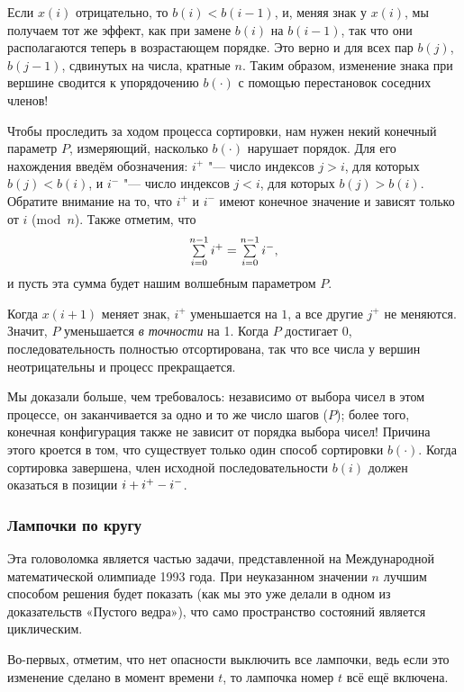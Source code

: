 \documentclass[twoside]{book}
\begin{document}
Если $x(i)$ отрицательно, то $b(i) < b(i-1)$, и, меняя знак у $x(i)$, мы получаем тот же эффект, как при замене $b(i)$ на $b(i - 1)$, так что они располагаются теперь в возрастающем порядке.
Это верно и для всех пар $b(j)$, $b(j - 1)$, сдвинутых на числа, кратные $n$.
Таким образом, изменение знака при вершине сводится к упорядочению $b(\cdot)$ с помощью перестановок соседних членов!

Чтобы проследить за ходом процесса сортировки, нам нужен некий конечный параметр $P$, измеряющий, насколько $b(\cdot)$ нарушает порядок. %
Для его нахождения введём обозначения: $i^+$ "--- число индексов $j > i$, для которых $b(j) < b(i)$, и $i^-$ "--- число индексов $j < i$, для которых $b(j) > b(i)$.
Обратите внимание на то, что $i^+$ и $i^-$ имеют конечное значение и зависят только от $i$ (mod~$n$).
Также отметим, что 
\[ \mathop{\textstyle\sum}\limits_{i=0}^{n-1}i^+= \mathop{\textstyle\sum}\limits_{i=0}^{n-1}i^-   ,
\]
и пусть эта сумма будет нашим волшебным параметром $P$.

Когда $x(i+1)$ меняет знак, $i^+$ уменьшается на $1$, а все другие $j^+$ не меняются.
Значит, $P$ уменьшается \emph{в точности} на 1.
Когда $P$ достигает $0$, последовательность полностью отсортирована, так что все числа у вершин неотрицательны и процесс прекращается.

Мы доказали больше, чем требовалось:
независимо от выбора чисел в этом процессе, он заканчивается за одно и то же число шагов ($P$);
более того, конечная конфигурация также не зависит от порядка выбора чисел!
Причина этого кроется в том, что существует только один способ сортировки $b(\cdot)$.
Когда сортировка завершена, член исходной последовательности $b(i)$ должен оказаться в позиции $i \z+ i^+ - i^-$.
\heart

\subsubsection*{Лампочки по кругу}%

Эта головоломка является частью задачи, представленной на Международной математической олимпиаде 1993 года.
При неуказанном значении $n$ лучшим способом решения будет показать (как мы это уже делали в одном из доказательств «Пустого ведра»), что само пространство состояний является циклическим.

\medskip

Во-первых, отметим, что нет опасности выключить все лампочки,
ведь если это изменение сделано в момент времени $t$, то лампочка номер $t$ всё ещё включена.
\end{document}
